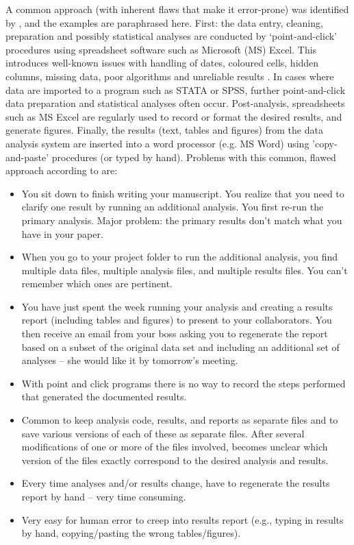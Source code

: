 \documentclass[11pt,a4paper]{article}
\begin{document}
A common approach (with inherent flaws that make it error-prone) was identified by \citet{Scott}, and the examples are paraphrased here.  
First: the data entry, cleaning, preparation and possibly statistical analyses are conducted by `point-and-click' procedures using spreadsheet software such as Microsoft (MS) Excel.
This introduces well-known issues with handling of dates, coloured cells, hidden columns, missing data, poor algorithms and unreliable results \citep{McCullough2008}.
In cases where data are imported to a program such as STATA or SPSS, further point-and-click data preparation and statistical analyses often occur.
Post-analysis, spreadsheets such as MS Excel are regularly used to record or format the desired results, and generate figures.
Finally, the results (text, tables and figures) from the data analysis system are inserted into a word processor (e.g. MS Word) using 'copy-and-paste' procedures (or typed by hand). 
\clearpage
Problems with this common, flawed approach according to \citet{Scott} are:
\begin{itemize}
\item You sit down to finish writing your manuscript. You realize that you need to clarify one result by running an additional analysis. You first re-run the primary analysis. Major problem: the primary results don’t match what you have in your paper.
\item When you go to your project folder to run the additional analysis, you find multiple data files, multiple analysis files,
and multiple results files. You can’t remember which ones are pertinent.
\item You have just spent the week running your analysis and creating a results report (including tables and figures) to present to your collaborators. You then receive an email from your boss asking you to regenerate the report based on a subset of the original data set and including an additional set of analyses – she would like it by tomorrow's meeting.
\item With point and click programs there is no way to record the steps performed that generated the documented results.
\item Common to keep analysis code, results, and reports as separate files and to save various versions of each of these as separate files.
After several modifications of one or more of the files involved, becomes unclear which version of the files exactly correspond to the desired analysis and results.
\item Every time analyses and/or results change, have to regenerate the results report by hand – very time consuming.
\item Very easy for human error to creep into results report (e.g., typing in results by hand, copying/pasting the wrong tables/figures).
\end{itemize}
\end{document}
